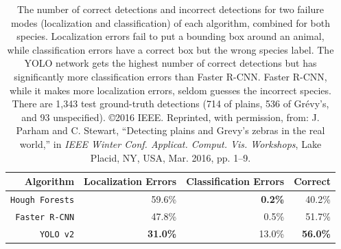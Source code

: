 \begin{table}[!t]
    \caption{The number of correct detections and incorrect detections for two failure modes (localization and classification) of each algorithm, combined for both species.  Localization errors fail to put a bounding box around an animal, while classification errors have a correct box but the wrong species label.  The YOLO network gets the highest number of correct detections but has significantly more classification errors than Faster R-CNN.  Faster R-CNN, while it makes more localization errors, seldom guesses the incorrect species.  There are 1,343 test ground-truth detections (714 of plains, 536 of Gr\'evy's, and 93 unspecified).  \copyright 2016 IEEE. Reprinted, with permission, from: J. Parham and C. Stewart, ``Detecting plains and Grevy’s zebras in the real world,'' in \textit{IEEE Winter Conf. Applicat. Comput. Vis. Workshops}, Lake Placid, NY, USA, Mar. 2016, pp. 1–9.}
    \label{tab:errors}
    \begin{center}
        \begin{tabular}{r|rrr}
            \hline
            \textbf{Algorithm}     & \textbf{Localization Errors} & \textbf{Classification Errors} & \textbf{Correct} \\
            \hline
            \texttt{Hough Forests} & 59.6\%                       & \textbf{0.2\%}                 & 40.2\%           \\
            \texttt{Faster R-CNN}  & 47.8\%                       & 0.5\%                          & 51.7\%           \\
            \texttt{YOLO v2}       & \textbf{31.0\%}              & 13.0\%                         & \textbf{56.0\%}
        \end{tabular}
    \end{center}
\end{table}

